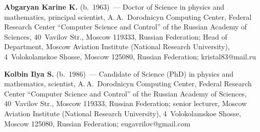 

\Contr

  \noindent
  \textbf{Abgaryan Karine K.} (b.\ 1963)~---
  Doctor of Science in physics and mathematics, principal scientist, 
A.\,A.~Dorodnicyn Computing Center, Federal Research Center ``Computer Science and Control'' of the 
Russian Academy of Sciences, 40~Vavilov Str., Moscow 119333, Russian Federation; Head of Department, 
Moscow Aviation Institute (National Research University), 4~Volokolamskoe Shosse, Moscow 125080, 
Russian Federation; \mbox{kristal83@mail.ru}
  
  \vspace*{6pt}
  
  \noindent
  \textbf{Kolbin Ilya S.} (b.\ 1986)~--- Candidate of Science (PhD) in physics and mathematics, scientist, 
A.\,A.~Dorodnicyn Computing Center, Federal Research Center ``Computer Science and Control'' of the 
Russian Academy of Sciences, 40~Vavilov Str., Moscow 119333, Russian Federation; senior lecturer, Moscow 
Aviation Institute (National Research University), 4~Volokolamskoe Shosse, Moscow 125080, Russian 
Federation; \mbox{eugavrilov@gmail.com}
\label{end\stat}

\renewcommand{\bibname}{\protect\rm Литература} 
    